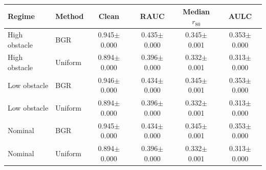 \begin{tabular}{llcccc}
\hline
Regime & Method & Clean & RAUC & Median $r_{80}$ & AULC \\
\hline
High obstacle & BGR & 0.945$\pm$0.000 & 0.435$\pm$0.000 & 0.345$\pm$0.001 & 0.353$\pm$0.000 \\
High obstacle & Uniform & 0.894$\pm$0.000 & 0.396$\pm$0.000 & 0.332$\pm$0.001 & 0.313$\pm$0.000 \\
Low obstacle & BGR & 0.946$\pm$0.000 & 0.434$\pm$0.000 & 0.345$\pm$0.001 & 0.353$\pm$0.000 \\
Low obstacle & Uniform & 0.894$\pm$0.000 & 0.396$\pm$0.000 & 0.332$\pm$0.001 & 0.313$\pm$0.000 \\
Nominal & BGR & 0.945$\pm$0.000 & 0.434$\pm$0.000 & 0.345$\pm$0.001 & 0.353$\pm$0.000 \\
Nominal & Uniform & 0.894$\pm$0.000 & 0.396$\pm$0.000 & 0.332$\pm$0.001 & 0.313$\pm$0.000 \\
\hline
\end{tabular}
